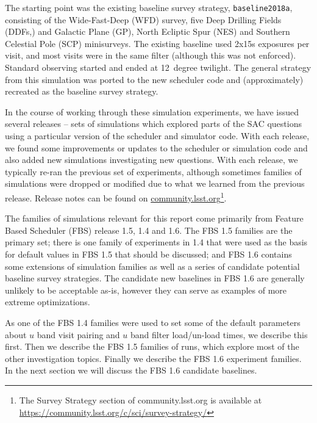 The starting point was the existing baseline survey strategy, {\tt baseline2018a}, consisting of the Wide-Fast-Deep (WFD) survey, five Deep Drilling Fields (DDFs,) and Galactic Plane (GP), North Ecliptic Spur (NES) and Southern Celestial Pole (SCP) minisurveys. The existing baseline used 2x15s exposures per visit, and most visits were in the same filter (although this was not enforced). Standard observing started and ended at 12~degree twilight. The general strategy from this simulation was ported to the new scheduler code and (approximately) recreated as the baseline survey strategy.

In the course of working through these simulation experiments, we have issued several releases -- sets of simulations which explored parts of the SAC questions using a particular version of the scheduler and simulator code. With each release, we found some improvements or updates to the scheduler or simulation code and also added new simulations investigating new questions. With each release, we typically re-ran the previous set of experiments, although sometimes families of simulations were dropped or modified due to what we learned from the previous release. Release notes can be found on \href{https://community.lsst.org/c/sci/survey-strategy/}{community.lsst.org}\footnote{The Survey Strategy section of community.lsst.org is available at \href{https://community.lsst.org/c/sci/survey-strategy/}{https://community.lsst.org/c/sci/survey-strategy/}}. 

The families of simulations relevant for this report come primarily from Feature Based Scheduler (FBS) release 1.5, 1.4 and 1.6. The FBS 1.5 families are the primary set; there is one family of experiments in 1.4 that were used as the basis for default values in FBS 1.5 that should be discussed; and FBS 1.6 contains some extensions of simulation families as well as a series of candidate potential baseline survey strategies. The candidate new baselines in FBS 1.6 are generally unlikely to be acceptable as-is, however they can serve as examples of more extreme optimizations. 

As one of the FBS 1.4 families were used to set some of the default parameters about $u$ band visit pairing and $u$ band filter load/un-load times, we describe this first. Then we describe the FBS 1.5 families of runs, which explore most of the other investigation topics. Finally we describe the FBS 1.6 experiment families. In the next section we will discuss the FBS 1.6 candidate baselines. 


